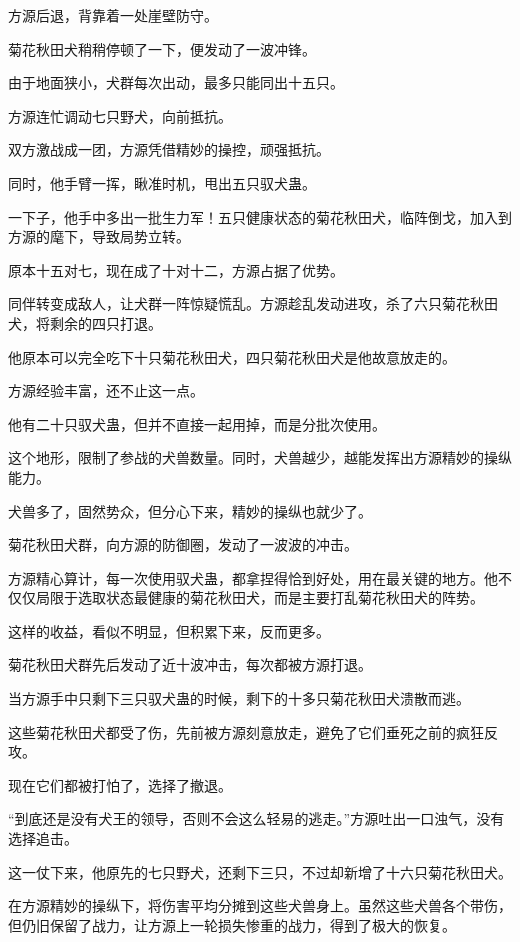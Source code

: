 \begin{this_body}
方源后退，背靠着一处崖壁防守。

菊花秋田犬稍稍停顿了一下，便发动了一波冲锋。

由于地面狭小，犬群每次出动，最多只能同出十五只。

方源连忙调动七只野犬，向前抵抗。

双方激战成一团，方源凭借精妙的操控，顽强抵抗。

同时，他手臂一挥，瞅准时机，甩出五只驭犬蛊。

一下子，他手中多出一批生力军！五只健康状态的菊花秋田犬，临阵倒戈，加入到方源的麾下，导致局势立转。

原本十五对七，现在成了十对十二，方源占据了优势。

同伴转变成敌人，让犬群一阵惊疑慌乱。方源趁乱发动进攻，杀了六只菊花秋田犬，将剩余的四只打退。

他原本可以完全吃下十只菊花秋田犬，四只菊花秋田犬是他故意放走的。

方源经验丰富，还不止这一点。

他有二十只驭犬蛊，但并不直接一起用掉，而是分批次使用。

这个地形，限制了参战的犬兽数量。同时，犬兽越少，越能发挥出方源精妙的操纵能力。

犬兽多了，固然势众，但分心下来，精妙的操纵也就少了。

菊花秋田犬群，向方源的防御圈，发动了一波波的冲击。

方源精心算计，每一次使用驭犬蛊，都拿捏得恰到好处，用在最关键的地方。他不仅仅局限于选取状态最健康的菊花秋田犬，而是主要打乱菊花秋田犬的阵势。

这样的收益，看似不明显，但积累下来，反而更多。

菊花秋田犬群先后发动了近十波冲击，每次都被方源打退。

当方源手中只剩下三只驭犬蛊的时候，剩下的十多只菊花秋田犬溃散而逃。

这些菊花秋田犬都受了伤，先前被方源刻意放走，避免了它们垂死之前的疯狂反攻。

现在它们都被打怕了，选择了撤退。

“到底还是没有犬王的领导，否则不会这么轻易的逃走。”方源吐出一口浊气，没有选择追击。

这一仗下来，他原先的七只野犬，还剩下三只，不过却新增了十六只菊花秋田犬。

在方源精妙的操纵下，将伤害平均分摊到这些犬兽身上。虽然这些犬兽各个带伤，但仍旧保留了战力，让方源上一轮损失惨重的战力，得到了极大的恢复。

\end{this_body}

